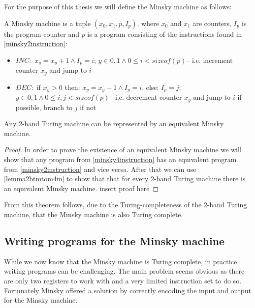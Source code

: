 For the purpose of this thesis we will define the Minsky machine as follows:
\begin{definition}
A Minsky machine is a tuple $(x_0, x_1, p, I_p)$, where $x_0$ and $x_1$ are counters, $I_p$ is the program counter and $p$ is a program consisting of the instructions found in \autoref{minsky2instruction}:
\begin{instructionset}
\label{minsky2instruction}
\hfill
\begin{itemize}
\item{$INC:$} $x_y = x_y + 1 \land I_p = i$; $ y\in{0,1} \land 0 \leq i < sizeof(p)$\hfill\break -- i.e. increment counter $x_y$ and jump to $i$
\item{$DEC:$} if $x_y > 0$ then: $x_y = x_y - 1 \land I_p = i$, else: $I_p = j$; $ y\in{0,1} \land 0 \leq i,j < sizeof(p)$\hfill\break -- i.e. decrement counter $x_y$ and jump to $i$ if possible, branch to $j$ if not
\end{itemize}
\end{instructionset}
\end{definition}
\begin{theorem}
Any 2-band Turing machine can be represented by an equivalent Minsky machine.
\begin{proof}
In order to prove the existence of an equivalent Minsky machine we will show that any program from \autoref{minsky4instruction} has an equivalent program from \autoref{minsky2instruction} and vice versa. After that we can use \autoref{lemma2btmtom4m} to show that that for every 2-band Turing machine there is an equivalent Minsky machine.
insert proof here
\end{proof}
\end{theorem}
From this theorem follows, due to the Turing-completeness of the 2-band Turing machine, that the Minsky machine is also Turing complete.

\subsection{Writing programs for the Minsky machine}
While we now know that the Minsky machine is Turing complete, in practice writing programs can be challenging.
The main problem seems obvious as there are only two registers to work with and a very limited instruction set to do so.
Fortunately Minsky offered a solution by correctly encoding the input and output for the Minsky machine\cite{Minsky:1967:CFI:1095587}.
